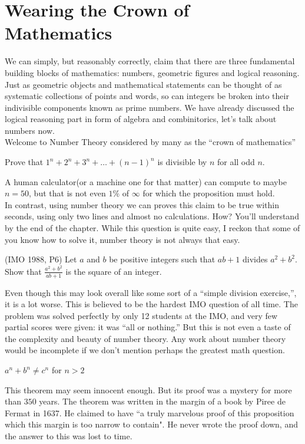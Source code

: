 \chapter{Wearing the Crown of Mathematics}
We can simply, but reasonably correctly, claim that there are three fundamental building blocks of mathematics: numbers, geometric figures and logical reasoning. Just as geometric objects and mathematical statements can be thought of as systematic collections of points and words, so can integers be broken into their indivisible components known as prime numbers. We have already discussed the logical reasoning part in form of algebra and combinitorics, let's talk about numbers now.\\
Welcome to Number Theory considered by many as the “crown of mathematics”\\
\begin{example}
    Prove that $1^n+2^n+3^n+\dots+(n-1)^n$ is divisible by $n$ for all odd $n$.
\end{example}
A human calculator(or a machine one for that matter) can compute to maybe $n=50$, but that is not even $1\%$ of $\infty$ for which the proposition must hold.\\
In contrast, using number theory we can proves this claim to be true within seconds, using only two lines and almost no calculations. How? You'll understand by the end of the chapter. While this question is quite easy, I reckon that some of you know how to solve it, number theory is not always that easy.\\
\begin{example}
    (IMO 1988, P6) Let $a$ and $b$ be positive integers such that $ab + 1$ divides $a^{2} + b^{2}$. Show that $\frac {a^{2} + b^{2}}{ab + 1}$ is the square of an integer.
\end{example}
Even though this may look overall like some sort of a “simple division exercise,”, it is a lot worse. This is believed to be the hardest IMO question of all time. The problem was solved perfectly by only 12 students at the IMO, and very few partial scores were given: it was “all or nothing.” But this is not even a taste of the complexity and beauty of number theory. Any work about number theory would be incomplete if we don't mention perhaps the greatest math question.\\
\begin{theorem}
    $a^n+b^n \neq c^n$ for $n>2$
\end{theorem}    
This theorem may seem innocent enough. But its proof was a mystery for more than $350$ years. The theorem was written in the margin of a book by Piree de Fermat in 1637. He claimed to have “a truly marvelous proof of this proposition which this margin is too narrow to contain". He never wrote the proof down, and the answer to this was lost to time.\\
